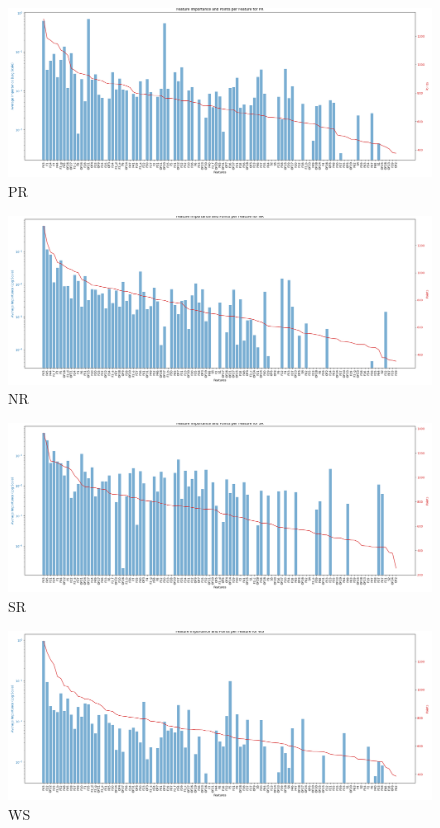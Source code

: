 
\begin{figure}
    \centering
    \includegraphics[width=0.95\linewidth]{./causalml_section/graphs/feature_importance_points_plot_PR.png}
    \caption{PR}
    \label{fig:pr_causalml}
\end{figure}

\begin{figure}
    \centering
    \includegraphics[width=0.95\linewidth]{./causalml_section/graphs/feature_importance_points_plot_NR.png}
    \caption{NR}
    \label{fig:nr_causalml}
\end{figure}

\begin{figure}
    \centering
    \includegraphics[width=0.95\linewidth]{./causalml_section/graphs/feature_importance_points_plot_SR.png}
    \caption{SR}
    \label{fig:sr_causalml}
\end{figure}

\begin{figure}
    \centering
    \includegraphics[width=0.95\linewidth]{./causalml_section/graphs/feature_importance_points_plot_WS.png}
    \caption{WS}
    \label{fig:ws_causalml}
\end{figure}

